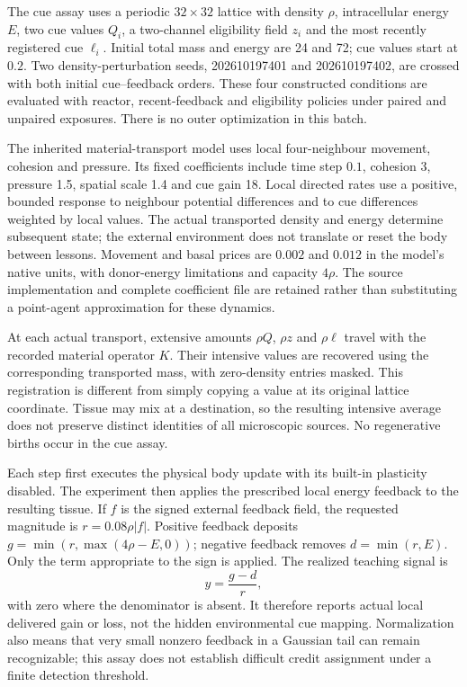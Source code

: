 The cue assay uses a periodic $32\times32$ lattice with density $\rho$, intracellular energy $E$, two cue values $Q_i$, a two-channel eligibility field $z_i$ and the most recently registered cue $\ell_i$. Initial total mass and energy are 24 and 72; cue values start at $0.2$. Two density-perturbation seeds, 202610197401 and 202610197402, are crossed with both initial cue--feedback orders. These four constructed conditions are evaluated with reactor, recent-feedback and eligibility policies under paired and unpaired exposures. There is no outer optimization in this batch.

The inherited material-transport model uses local four-neighbour movement, cohesion and pressure. Its fixed coefficients include time step $0.1$, cohesion 3, pressure 1.5, spatial scale 1.4 and cue gain 18. Local directed rates use a positive, bounded response to neighbour potential differences and to cue differences weighted by local values. The actual transported density and energy determine subsequent state; the external environment does not translate or reset the body between lessons. Movement and basal prices are $0.002$ and $0.012$ in the model's native units, with donor-energy limitations and capacity $4\rho$. The source implementation and complete coefficient file are retained rather than substituting a point-agent approximation for these dynamics.

At each actual transport, extensive amounts $\rho Q$, $\rho z$ and $\rho\ell$ travel with the recorded material operator $K$. Their intensive values are recovered using the corresponding transported mass, with zero-density entries masked. This registration is different from simply copying a value at its original lattice coordinate. Tissue may mix at a destination, so the resulting intensive average does not preserve distinct identities of all microscopic sources. No regenerative births occur in the cue assay.

Each step first executes the physical body update with its built-in plasticity disabled. The experiment then applies the prescribed local energy feedback to the resulting tissue. If $f$ is the signed external feedback field, the requested magnitude is $r=0.08\rho|f|$. Positive feedback deposits $g=\min(r,\max(4\rho-E,0))$; negative feedback removes $d=\min(r,E)$. Only the term appropriate to the sign is applied. The realized teaching signal is
\begin{equation}
y=\frac{g-d}{r},
\end{equation}
with zero where the denominator is absent. It therefore reports actual local delivered gain or loss, not the hidden environmental cue mapping. Normalization also means that very small nonzero feedback in a Gaussian tail can remain recognizable; this assay does not establish difficult credit assignment under a finite detection threshold.

